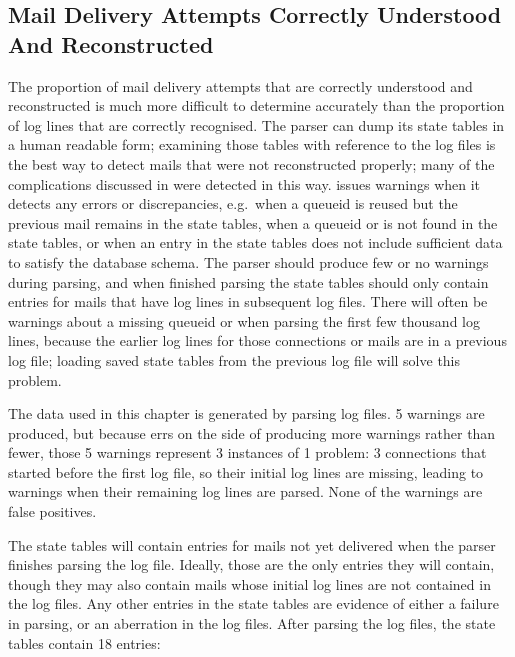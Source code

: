 \subsection{Mail Delivery Attempts Correctly Understood And Reconstructed}

\label{mails-covered}

The proportion of mail delivery attempts that are correctly understood and
reconstructed is much more difficult to determine accurately than the
proportion of log lines that are correctly recognised.  The parser can dump
its state tables in a human readable form; examining those tables with
reference to the log files is the best way to detect mails that were not
reconstructed properly; many of the complications discussed in
 were detected in this way.  \parsername{} issues
warnings when it detects any errors or discrepancies, e.g.\ when a queueid
is reused but the previous mail remains in the state tables, when a queueid
or  is not found in the state tables, or when an entry in the
state tables does not include sufficient data to satisfy the database
schema.  The parser should produce few or no warnings during parsing, and
when finished parsing the state tables should only contain entries for
mails that have log lines in subsequent log files.  There will often be
warnings about a missing queueid or  when parsing the first
few thousand log lines, because the earlier log lines for those connections
or mails are in a previous log file; loading saved state tables from the
previous log file will solve this problem.

The data used in this chapter is generated by parsing \numberOFlogFILES{}
log files.  5 warnings are produced, but because \parsername{} errs on the
side of producing more warnings rather than fewer, those 5 warnings
represent 3 instances of 1 problem: 3 connections that started before the
first log file, so their initial log lines are missing, leading to warnings
when their remaining log lines are parsed.  None of the warnings are false
positives.

The state tables will contain entries for mails not yet delivered when the
parser finishes parsing the log file.  Ideally, those are the only entries
they will contain, though they may also contain mails whose initial log
lines are not contained in the log files.  Any other entries in the state
tables are evidence of either a failure in parsing, or an aberration in the
log files.  After parsing the \numberOFlogFILES{} log files, the state
tables contain 18 entries:

